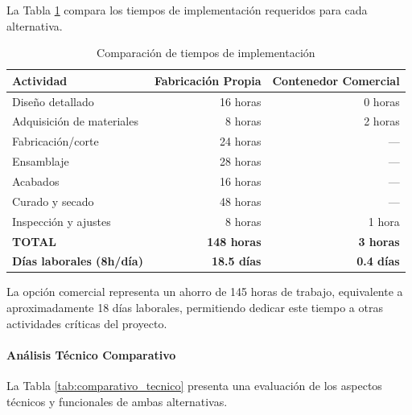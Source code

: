 La Tabla \ref{tab:tiempos_contenedor} compara los tiempos de implementación requeridos para cada alternativa.

\begin{table}[H]
\centering
\caption{Comparación de tiempos de implementación}
\label{tab:tiempos_contenedor}
\begin{tabular}{|l|r|r|}
\hline
\textbf{Actividad} & \textbf{Fabricación Propia} & \textbf{Contenedor Comercial} \\
\hline
Diseño detallado & 16 horas & 0 horas \\
Adquisición de materiales & 8 horas & 2 horas \\
Fabricación/corte & 24 horas & --- \\
Ensamblaje & 28 horas & --- \\
Acabados & 16 horas & --- \\
Curado y secado & 48 horas & --- \\
Inspección y ajustes & 8 horas & 1 hora \\
\hline
\textbf{TOTAL} & \textbf{148 horas} & \textbf{3 horas} \\
\textbf{Días laborales (8h/día)} & \textbf{18.5 días} & \textbf{0.4 días} \\
\hline
\end{tabular}
\end{table}

La opción comercial representa un ahorro de 145 horas de trabajo, equivalente a aproximadamente 18 días laborales, permitiendo dedicar este tiempo a otras actividades críticas del proyecto.

\paragraph{Análisis Técnico Comparativo}

La Tabla \ref{tab:comparativo_tecnico} presenta una evaluación de los aspectos técnicos y funcionales de ambas alternativas.


